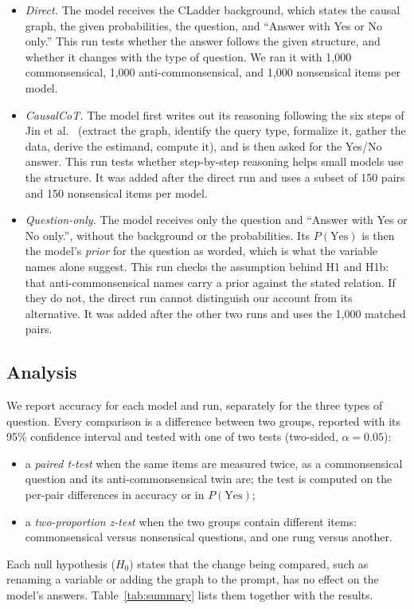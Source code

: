 \documentclass{llncs}
\begin{document}
\begin{itemize}
  \item \emph{Direct.} The model receives the CLadder background, which states the causal graph, the given probabilities, the question, and ``Answer with Yes or No only.'' This run tests whether the answer follows the given structure, and whether it changes with the type of question. We ran it with 1,000 commonsensical, 1,000 anti-commonsensical, and 1,000 nonsensical items per model.
  \item \emph{CausalCoT.} The model first writes out its reasoning following the six steps of Jin et al.\ \cite{jin2023cladder} (extract the graph, identify the query type, formalize it, gather the data, derive the estimand, compute it), and is then asked for the Yes/No answer. This run tests whether step-by-step reasoning helps small models use the structure. It was added after the direct run and uses a subset of 150 pairs and 150 nonsensical items per model.
  \item \emph{Question-only.} The model receives only the question and ``Answer with Yes or No only.'', without the background or the probabilities. Its $P(\text{Yes})$ is then the model's \emph{prior} for the question as worded, which is what the variable names alone suggest. This run checks the assumption behind H1 and H1b: that anti-commonsensical names carry a prior against the stated relation. If they do not, the direct run cannot distinguish our account from its alternative. It was added after the other two runs and uses the 1,000 matched pairs.
\end{itemize}

\subsection{Analysis}
\label{sec:analysis}

We report accuracy for each model and run, separately for the three types of question. Every comparison is a difference between two groups, reported with its 95\% confidence interval and tested with one of two tests (two-sided, $\alpha = 0.05$):
\begin{itemize}
\item a \emph{paired t-test} when the same items are measured twice, as a commonsensical question and its anti-commonsensical twin are; the test is computed on the per-pair differences in accuracy or in $P(\text{Yes})$;
\item a \emph{two-proportion z-test} when the two groups contain different items: commonsensical versus nonsensical questions, and one rung versus another.
\end{itemize}
Each null hypothesis ($H_0$) states that the change being compared, such as renaming a variable or adding the graph to the prompt, has no effect on the model's answers. Table~\ref{tab:summary} lists them together with the results.
\end{document}

